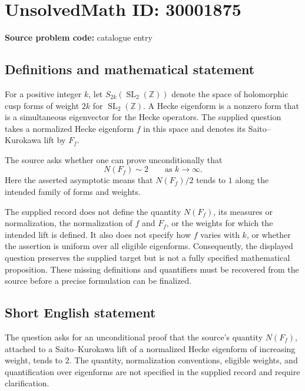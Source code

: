 \documentclass[11pt]{article}
\newcommand{\Z}{\mathbb{Z}}
\begin{document}
\section*{UnsolvedMath ID: 30001875}
\textbf{Source problem code:} catalogue entry
\subsection{Definitions and mathematical statement}
For a positive integer \(k\), let \(S_{2k}(\operatorname{SL}_2(\Z))\) denote the space of holomorphic cusp forms of weight \(2k\) for \(\operatorname{SL}_2(\Z)\). A Hecke eigenform is a nonzero form that is a simultaneous eigenvector for the Hecke operators. The supplied question takes a normalized Hecke eigenform \(f\) in this space and denotes its Saito--Kurokawa lift by \(F_f\).

The source asks whether one can prove unconditionally that
\[
N(F_f)\sim 2\qquad\text{as }k\to\infty.
\]
Here the asserted asymptotic means that \(N(F_f)/2\) tends to \(1\) along the intended family of forms and weights.

The supplied record does not define the quantity \(N(F_f)\), its measures or normalization, the normalization of \(f\) and \(F_f\), or the weights for which the intended lift is defined. It also does not specify how \(f\) varies with \(k\), or whether the assertion is uniform over all eligible eigenforms. Consequently, the displayed question preserves the supplied target but is not a fully specified mathematical proposition. These missing definitions and quantifiers must be recovered from the source before a precise formulation can be finalized.
\subsection{Short English statement}
The question asks for an unconditional proof that the source's quantity \(N(F_f)\), attached to a Saito--Kurokawa lift of a normalized Hecke eigenform of increasing weight, tends to \(2\). The quantity, normalization conventions, eligible weights, and quantification over eigenforms are not specified in the supplied record and require clarification.
\end{document}
